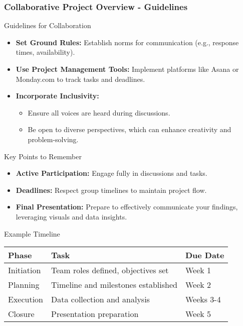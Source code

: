 \documentclass{beamer}
\begin{document}
\begin{frame}[fragile]
    \frametitle{Collaborative Project Overview - Guidelines}
    
    \begin{block}{Guidelines for Collaboration}
        \begin{itemize}
            \item \textbf{Set Ground Rules:} Establish norms for communication (e.g., response times, availability).
            \item \textbf{Use Project Management Tools:} Implement platforms like Asana or Monday.com to track tasks and deadlines.
            \item \textbf{Incorporate Inclusivity:} 
            \begin{itemize}
                \item Ensure all voices are heard during discussions.
                \item Be open to diverse perspectives, which can enhance creativity and problem-solving.
            \end{itemize}
        \end{itemize}
    \end{block}
    
    \begin{block}{Key Points to Remember}
        \begin{itemize}
            \item \textbf{Active Participation:} Engage fully in discussions and tasks.
            \item \textbf{Deadlines:} Respect group timelines to maintain project flow.
            \item \textbf{Final Presentation:} Prepare to effectively communicate your findings, leveraging visuals and data insights.
        \end{itemize}
    \end{block}
    
    \begin{block}{Example Timeline}
        \begin{tabular}{|l|l|l|}
            \hline
            \textbf{Phase} & \textbf{Task} & \textbf{Due Date} \\
            \hline
            Initiation & Team roles defined, objectives set & Week 1 \\
            Planning & Timeline and milestones established & Week 2 \\
            Execution & Data collection and analysis & Weeks 3-4 \\
            Closure & Presentation preparation & Week 5 \\
            \hline
        \end{tabular}
    \end{block}
\end{frame}
\end{document}
